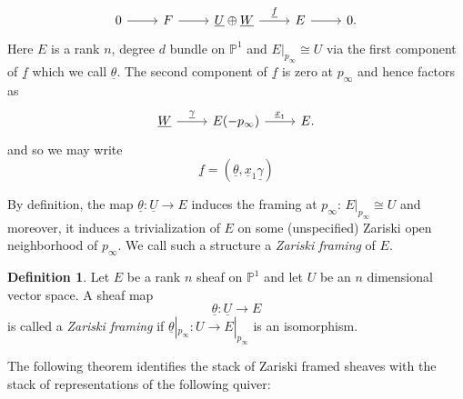 \documentclass{amsart}
\theoremstyle{definition}
\newtheorem{definition}[theorem]{Definition}
\newcommand{\PP}{\mathbb{P}}
\newcommand{\UL}[1]{\underline{#1}}
\begin{document}
\[
\begin{tikzcd}
0\arrow[r]& F \arrow[r]& \UL{U}\oplus \UL{W} \arrow{r}{\UL{f} } &E
\arrow[r]& 0.
\end{tikzcd}
\]
Here $E$ is a rank $n$, degree $d$ bundle on $\PP^{1}$ and
$E|_{p_{\infty}}\cong U$ via the first component of $\UL{f}$ which we
call $\UL{\theta}$. The second component of $\UL{f}$ is zero at
$p_{\infty}$ and hence factors as
\[
\begin{tikzcd}
 \UL{W} \arrow[r,"\UL{\gamma }"]& E(-p_{\infty})
 \arrow[r,"\UL{x}_{1}"] &E. 
\end{tikzcd}
\]
and so we may write
\[
\UL{f}
=({\UL{\theta}},\UL{x}_{1}\UL{\gamma })
\]

By definition, the map $\UL{\theta}:\UL{U}\to E$ induces the framing
at $p_{\infty}$: $E|_{p_{\infty}}\cong U$ and moreover, it induces a
trivialization of $E$ on some (unspecified) Zariski open neighborhood
of $p_{\infty}$. We call such a structure a \emph{Zariski framing} of $E$.

\begin{definition}\label{defn: Zariski framing}
Let $E$ be a rank $n$ sheaf on $\PP^{1}$ and let $U$ be an $n$
dimensional vector space. A sheaf map
\[
\UL{\theta}: \UL{U}\to E
\]
is called a \emph{Zariski framing} if $\UL{\theta}|_{p_{\infty}}:U \to
E|_{p_{\infty}}$ is an isomorphism.
\end{definition}

The following theorem identifies the stack of Zariski framed sheaves
with the stack of representations of the following quiver:

\begin{center}
\end{center}
\end{document}
